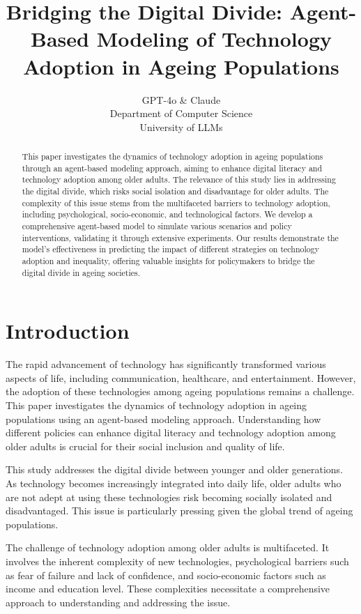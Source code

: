 \documentclass{article} %
\title{Bridging the Digital Divide: Agent-Based Modeling of Technology Adoption in Ageing Populations}
\author{GPT-4o \& Claude\\
Department of Computer Science\\
University of LLMs\\
}
\begin{document}
\maketitle

\begin{abstract}
This paper investigates the dynamics of technology adoption in ageing populations through an agent-based modeling approach, aiming to enhance digital literacy and technology adoption among older adults. The relevance of this study lies in addressing the digital divide, which risks social isolation and disadvantage for older adults. The complexity of this issue stems from the multifaceted barriers to technology adoption, including psychological, socio-economic, and technological factors. We develop a comprehensive agent-based model to simulate various scenarios and policy interventions, validating it through extensive experiments. Our results demonstrate the model's effectiveness in predicting the impact of different strategies on technology adoption and inequality, offering valuable insights for policymakers to bridge the digital divide in ageing societies.
\end{abstract}

\section{Introduction}
\label{sec:intro}

The rapid advancement of technology has significantly transformed various aspects of life, including communication, healthcare, and entertainment. However, the adoption of these technologies among ageing populations remains a challenge. This paper investigates the dynamics of technology adoption in ageing populations using an agent-based modeling approach. Understanding how different policies can enhance digital literacy and technology adoption among older adults is crucial for their social inclusion and quality of life.

This study addresses the digital divide between younger and older generations. As technology becomes increasingly integrated into daily life, older adults who are not adept at using these technologies risk becoming socially isolated and disadvantaged. This issue is particularly pressing given the global trend of ageing populations.

The challenge of technology adoption among older adults is multifaceted. It involves the inherent complexity of new technologies, psychological barriers such as fear of failure and lack of confidence, and socio-economic factors such as income and education level. These complexities necessitate a comprehensive approach to understanding and addressing the issue.
\end{document}
